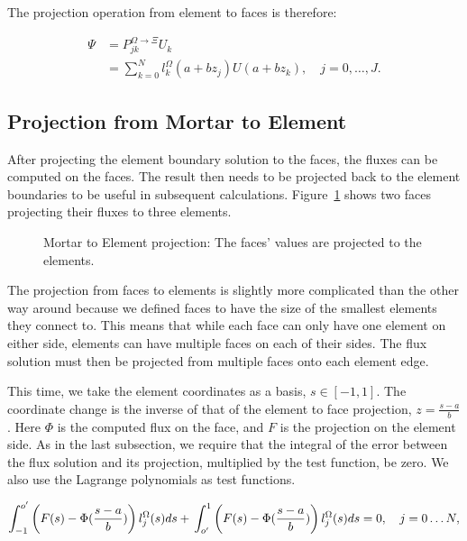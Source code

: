 The projection operation from element to faces is therefore:

\begin{align}  \label{projection_element_to_face}
    \Psi &= P_{jk}^{\Omega \rightarrow \Xi} U_k  \\
    &= \sum_{k = 0}^{N}l_k ^ \Omega(a+ b z_j) U(a + b z_k), \quad j = 0, \ldots, J.
\end{align}

\subsection{Projection from Mortar to Element}\label{subsection:adaptive_mesh_refinement:mortar_element_method:mortar_to_element}

After projecting the element boundary solution to the faces, the fluxes can be computed on the
faces. The result then needs to be projected back to the element boundaries to be useful in
subsequent calculations. Figure~\ref{fig:mortar_to_element} shows two faces projecting their fluxes
to three elements.

\begin{figure}[H]
    \centering
    
    \caption{Mortar to Element projection: The faces' values are projected to the elements.}\label{fig:mortar_to_element}
\end{figure}

The projection from faces to elements is slightly more complicated than the
other way around because we defined faces to have the size of the smallest elements they connect to.
This means that while each face can only have one element on either side, elements can have multiple
faces on each of their sides. The flux solution must then be projected from multiple faces onto each
element edge.

This time, we take the element coordinates as a basis, \(s \in [-1, 1]\). The coordinate change is
the inverse of that of the element to face projection, \(z = \frac{s - a}{b}\). Here \(\Phi \) is
the computed flux on the face, and \(F\) is the projection on the element side. As in the last
subsection, we require that the integral of the error between the flux solution and its projection,
multiplied by the test function, be zero. We also use the Lagrange polynomials as test functions.

\begin{equation} \label{equ:zero_error_to_element}
    \int_{-1}^{o'} \left( F(s) - \Phi (\frac{s - a}{b}) \right) l_j^\Omega(s)ds + \\
    \int_{o'}^{1} \left( F(s) - \Phi (\frac{s - a}{b}) \right) l_j^\Omega (s)ds = 0, \\
    \quad j = 0 \ldots N,
\end{equation}

